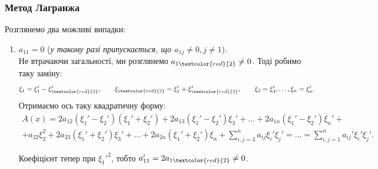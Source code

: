 \documentclass{math_library}
\begin{document}
\subsubsection{Метод Лагранжа}
Розглянемо два можливі випадки:
\begin{enumerate}[wide=0pt,label={\Roman*.}]
\item $a_{11} = 0$ (\textit{у такому разі припускається, що $a_{1j} \neq 0, j \neq 1$}). \\
Не втрачаючи загальності, ми розглянемо $a_{1\textcolor{red}{2}} \neq 0$. Тоді робимо таку заміну:
\[
\xi_1 = \xi_1' - \xi_{\textcolor{red}{2}}',\qquad \xi_{\textcolor{red}{2}} = \xi_1' + \xi_{\textcolor{red}{2}}',\qquad \xi_3 = \xi_3',\dots,\xi_n = \xi_n'.
\]
Отримаємо ось таку квадратичну форму:
\begin{align*}
A(x) = 2a_{12} (\xi_1' - \xi_2') (\xi_1' + \xi_2') + 2a_{13} (\xi_1'-\xi_2') \xi_3' + \dots + 2a_{1n} (\xi_1' - \xi_2')\xi_n' + \\ + a_{22}\xi_2^2 + 2a_{23}(\xi_1'+\xi_2') \xi_3' + \dots + 2a_{2n}(\xi_1'+\xi_2')\xi_n + \displaystyle\sum_{i,j=3}^n a_{ij} \xi_i' \xi_j' = \dots = \displaystyle\sum_{i,j=1}^n a_{ij}' \xi_i' \xi_j'.
\end{align*}

Коефіцієнт тепер при ${\xi_1'}^2$, тобто $a_{11}' = 2a_{1\textcolor{red}{2}} \neq 0$.


\end{enumerate}
\end{document}
